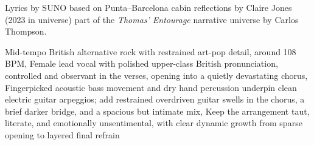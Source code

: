 
\begin{notes}
Lyrics by SUNO based on Punta--Barcelona cabin reflections by Claire Jones (2023 in universe) %
part of the \emph{Thomas’ Entourage} narrative universe by Carlos Thompson.
\end{notes}
\begin{style}
Mid-tempo British alternative rock with restrained art-pop detail, around 108 BPM, Female lead vocal with polished upper-class British pronunciation, controlled and observant in the verses, opening into a quietly devastating chorus, Fingerpicked acoustic bass movement and dry hand percussion underpin clean electric guitar arpeggios; add restrained overdriven guitar swells in the chorus, a brief darker bridge, and a spacious but intimate mix, Keep the arrangement taut, literate, and emotionally unsentimental, with clear dynamic growth from sparse opening to layered final refrain
\end{style}
